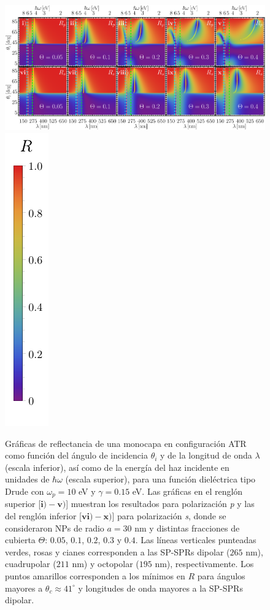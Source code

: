   	\begin{figure}[h!]\centering
\includegraphics[width = .9\linewidth]{2-Resultados/figs/2-Wp10ThetaVar/0-2D_Grid.png}%
\includegraphics[scale=.85, trim={00 -5 00 00}, clip]{2-Resultados/figs/0-RBar_v}
	\caption{Gráficas de reflectancia de una monocapa en configuración ATR como función del ángulo de incidencia $\theta_i$ y de la longitud de onda $\lambda$ (escala inferior), así como de la energía del haz incidente en unidades de $\hbar\omega$ (escala superior), para una función dieléctrica tipo Drude con $\omega_p=10$ eV  y  $\gamma=0. 15$ eV.  Las gráficas   en el renglón superior [$\mathbf{i)-v)}$] muestran los resultados  para  polarización \emph{p} y las del renglón inferior  [$\mathbf{vi)-x)}$] para polarización  \emph{s}, donde se consideraron NPs de radio $a=30$ nm y distintas fracciones de cubierta $\Theta$: $0. 05$, $0. 1$, $0. 2$, $0. 3$ y $0. 4$. Las líneas verticales punteadas verdes, rosas y cianes corresponden a las SP-SPRs dipolar ($265$ nm), cuadrupolar ($211$ nm) y octopolar ($195$ nm), respectivamente.  Los puntos amarillos corresponden a los mínimos en $R$ para ángulos mayores a $\theta_c\approx 41^\circ$ y longitudes de onda mayores a la SP-SPRs dipolar. }	\label{fig:R-ATR10}	
	\end{figure}		
	
